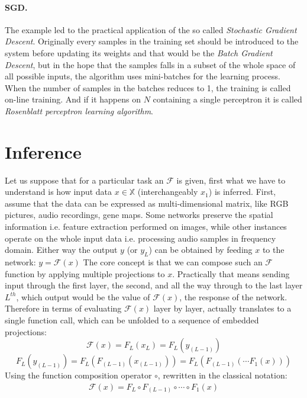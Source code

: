 \paragraph{SGD.} The example led to the practical application of the so called \emph{Stochastic Gradient Descent}.
Originally every samples in the training set should be introduced to the system before updating its weights and that would be the \emph{Batch Gradient Descent}, but in  the hope that the samples falls in a subset of the whole space of all possible inputs, the algorithm uses mini-batches for the learning process. When the number of samples in the batches reduces to 1, the training is called on-line training. And if it happens on $N$ containing a single perceptron it is called \emph{Rosenblatt perceptron learning algorithm}.


\section{Inference}
Let us suppose that for a particular task an $\mathcal{F}$ is given, first what we have to understand is how input data 
$x \in \mathbb{X}$ (interchangeably $x_1$) is inferred.
First, assume that the data can be expressed as multi-dimensional matrix, like RGB pictures, audio recordings, gene maps.
Some networks preserve the spatial information i.e. feature extraction performed on images, 
while other instances operate on the whole input data i.e. processing audio samples in frequency domain.
Either way the output $y$ (or $y_L$) can be obtained by feeding $x$ to the network: 
$ y = \mathcal{F}(x)$
The core concept is that we can compose such an $\mathcal{F}$ function by applying multiple projections to $x$.
Practically that means sending input through the first layer, the second, and all the way through to the last layer $L^{th}$, which output would be the value of $\mathcal{F}(x)$, the response of the network.
Therefore in terms of evaluating $\mathcal{F}(x)$ layer by layer, actually translates to a single function call, which can be unfolded to a sequence of embedded projections:
$$
    \mathcal{F}(x) = F_L \left( x_L \right) = F_L \left( y_{(L-1)} \right)
$$
$$
    F_L \left( y_{(L-1)} \right) = 
    F_L \left( F_{(L-1)} \left( x_{(L-1)} \right) \right) = F_L \left( F_{(L-1)}\left( \cdots F_1(x)\right)\right)
$$
Using the function composition operator $\circ$, rewritten in the classical notation:
\begin{equation}\label{eq:forward}
\begin{split}
    \mathcal{F}(x) = F_L \circ F_{(L-1)} \circ \cdots \circ F_1(x)
\end{split}
\end{equation}


